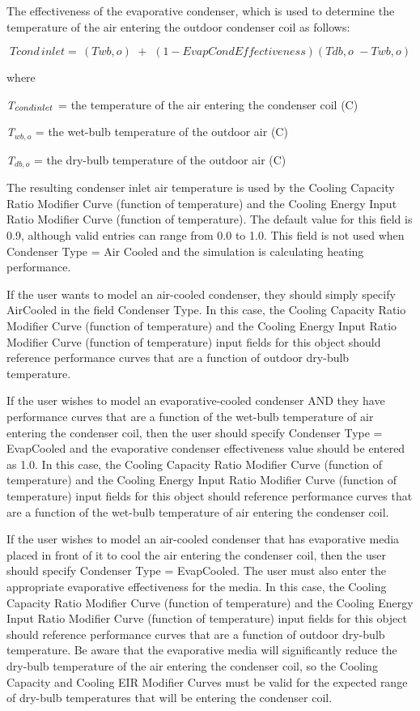 The effectiveness of the evaporative condenser, which is used to determine the temperature of the air entering the outdoor condenser coil as follows:

\begin{equation}
Tcond\,inlet = \,\left( {Twb,o} \right)\,\, + \,\,\left( {1 - EvapCondEffectiveness} \right)\left( {Tdb,o\,\, - Twb,o} \right)
\end{equation}

where

\emph{T\(_{cond\\ inlet}\)} = the temperature of the air entering the condenser coil (C)

\emph{T\(_{wb,o}\)} = the wet-bulb temperature of the outdoor air (C)

\emph{T\(_{db,o}\)} = the dry-bulb temperature of the outdoor air (C)

The resulting condenser inlet air temperature is used by the Cooling Capacity Ratio Modifier Curve (function of temperature) and the Cooling Energy Input Ratio Modifier Curve (function of temperature). The default value for this field is 0.9, although valid entries can range from 0.0 to 1.0. This field is not used when Condenser Type = Air Cooled and the simulation is calculating heating performance.

If the user wants to model an air-cooled condenser, they should simply specify AirCooled in the field Condenser Type. In this case, the Cooling Capacity Ratio Modifier Curve (function of temperature) and the Cooling Energy Input Ratio Modifier Curve (function of temperature) input fields for this object should reference performance curves that are a function of outdoor dry-bulb temperature.

If the user wishes to model an evaporative-cooled condenser AND they have performance curves that are a function of the wet-bulb temperature of air entering the condenser coil, then the user should specify Condenser Type = EvapCooled and the evaporative condenser effectiveness value should be entered as 1.0. In this case, the Cooling Capacity Ratio Modifier Curve (function of temperature) and the Cooling Energy Input Ratio Modifier Curve (function of temperature) input fields for this object should reference performance curves that are a function of the wet-bulb temperature of air entering the condenser coil.

If the user wishes to model an air-cooled condenser that has evaporative media placed in front of it to cool the air entering the condenser coil, then the user should specify Condenser Type = EvapCooled. The user must also enter the appropriate evaporative effectiveness for the media. In this case, the Cooling Capacity Ratio Modifier Curve (function of temperature) and the Cooling Energy Input Ratio Modifier Curve (function of temperature) input fields for this object should reference performance curves that are a function of outdoor dry-bulb temperature. Be aware that the evaporative media will significantly reduce the dry-bulb temperature of the air entering the condenser coil, so the Cooling Capacity and Cooling EIR Modifier Curves must be valid for the expected range of dry-bulb temperatures that will be entering the condenser coil.

